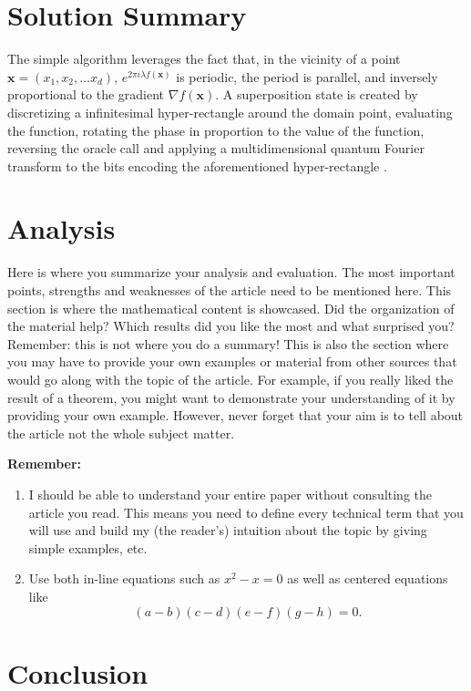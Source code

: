 \documentclass{article}
\begin{document}
\section{Solution Summary}


The simple algorithm leverages the fact that, in the vicinity of a point \(\mathbf{x} = (x_1, x_2, \ldots x_d)\),
\(e^{2 \pi \iota \lambda f(\mathbf{x})}\) is periodic, the period is parallel, and inversely
proportional to the gradient \(\nabla f(\mathbf{x})\). A superposition state is created by
discretizing a infinitesimal hyper-rectangle around the domain point, evaluating the function,
rotating the phase in proportion to the value of the function, reversing the oracle call and
applying a multidimensional quantum Fourier transform to the bits encoding the aforementioned
hyper-rectangle \cite{quant-ph/0507109}.

\section{Analysis}

Here is where you summarize your analysis and evaluation. The most important points, strengths and weaknesses of the article need to be mentioned here. This section is where the mathematical content is showcased. Did the organization of the material help? Which results did you like the most and what surprised you? Remember: this is not where you do a summary! This is also the section where you may have to provide your own examples or material from other sources that would go along with the topic of the article. For example, if you really liked the result of a theorem, you might want to demonstrate your understanding of it by providing your own example. However, never forget that your aim is to tell about the article not the whole subject matter.

\textbf{Remember:}

\begin{enumerate}
  \item I should be able to understand your entire paper without consulting the article you read. This means you need to define every technical term that you will use and build my (the reader's) intuition about the topic by giving simple examples, etc.
  \item Use both in-line equations such as $x^2-x=0$ as well as centered equations like
        $$(a-b)(c-d)(e-f)(g-h)=0.$$
\end{enumerate}

\section{Conclusion}
\end{document}
